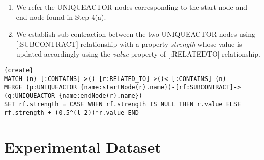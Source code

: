 \documentclass[11pt]{article}
\begin{document}
{{{\begin{enumerate}
\begin{enumerate}
\item We refer the UNIQUEACTOR nodes corresponding to the start node and end node found in Step 4(a).
\item We establish sub-contraction between the two UNIQUEACTOR nodes using [:SUBCONTRACT] relationship with a property \textit{strength} whose value is updated accordingly using the \textit{value} property of [:RELATED\textunderscore TO] relationship.
\end{enumerate}
\lstset{language=SQL} 
\begin{lstlisting}{create}
MATCH (n)-[:CONTAINS]->()-[r:RELATED_TO]->()<-[:CONTAINS]-(n)
MERGE (p:UNIQUEACTOR {name:startNode(r).name})-[rf:SUBCONTRACT]->(q:UNIQUEACTOR {name:endNode(r).name})
SET rf.strength = CASE WHEN rf.strength IS NULL THEN r.value ELSE rf.strength + (0.5^(l-2))*r.value END
\end{lstlisting}
\end{enumerate}
}

%

\section{\textbf{Experimental Dataset}}

}}
\end{document}
